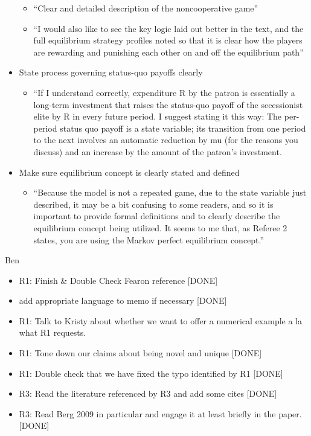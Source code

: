\documentclass[12pt]{article}
\begin{document}
\begin{itemize}
		\begin{itemize}
			\item ``Clear and detailed description of the noncooperative game''
			\item ``I would also like to see the key logic laid out better in the text, and the full
equilibrium strategy profiles noted so that it is clear how the players are rewarding and punishing each other on and off the equilibrium path''
		\end{itemize}
	\item State process governing status-quo payoffs clearly
		\begin{itemize}
			\item ``If I understand correctly, expenditure R by the patron is essentially a long-term investment that raises the status-quo payoff of the secessionist elite by R in every future period. I suggest stating it this way: The per-period status quo payoff is a state variable; its transition from one period to the next involves an automatic reduction by mu (for the reasons you discuss) and an increase by the amount of the patron's investment.
		\end{itemize}
	\item Make sure equilibrium concept is clearly stated and defined
		\begin{itemize}
			\item ``Because the model is not a repeated game, due to the state variable just described, it may be a bit confusing to some readers, and so it is important to provide formal definitions and to clearly describe the equilibrium concept being utilized. It seems to me that, as Referee 2 states, you are using the Markov perfect equilibrium concept.''
		\end{itemize}
\end{itemize}


Ben
\begin{itemize}
	\item R1: Finish \& Double Check Fearon reference [DONE]
		\item add appropriate language to memo if necessary [DONE]

	\item R1: Talk to Kristy about whether we want to offer a numerical example a la what R1 requests.
	
	\item R1: Tone down our claims about being novel and unique [DONE]
	
	\item R1: Double check that we have fixed the typo identified by R1 [DONE]
	
	\item R3: Read the literature referenced by R3 and add some cites [DONE]
	
	\item R3: Read Berg 2009 in particular and engage it at least briefly in the paper. [DONE]

\end{itemize}
\end{document}
